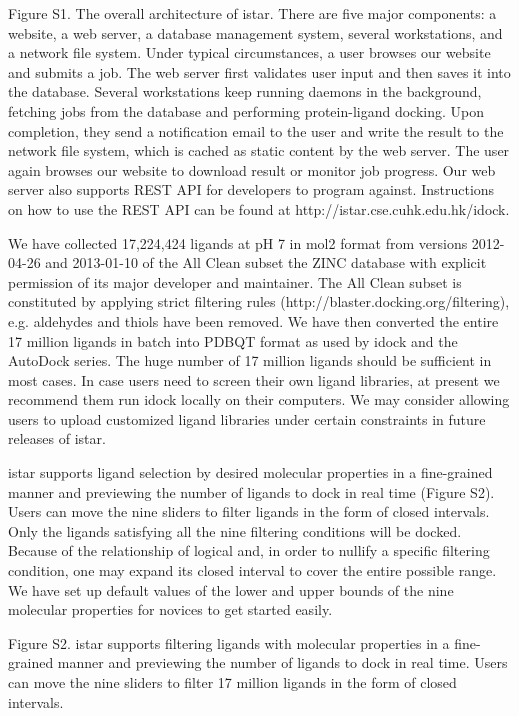 Figure S1. The overall architecture of istar. There are five major components: a website, a web server, a database management system, several workstations, and a network file system. Under typical circumstances, a user browses our website and submits a job. The web server first validates user input and then saves it into the database. Several workstations keep running daemons in the background, fetching jobs from the database and performing protein-ligand docking. Upon completion, they send a notification email to the user and write the result to the network file system, which is cached as static content by the web server. The user again browses our website to download result or monitor job progress. Our web server also supports REST API for developers to program against. Instructions on how to use the REST API can be found at http://istar.cse.cuhk.edu.hk/idock.

We have collected 17,224,424 ligands at pH 7 in mol2 format from versions 2012-04-26 and 2013-01-10 of the All Clean subset the ZINC database \cite{532,1178} with explicit permission of its major developer and maintainer. The All Clean subset is constituted by applying strict filtering rules (http://blaster.docking.org/filtering), e.g. aldehydes and thiols have been removed. We have then converted the entire 17 million ligands in batch into PDBQT format as used by idock and the AutoDock series. The huge number of 17 million ligands should be sufficient in most cases. In case users need to screen their own ligand libraries, at present we recommend them run idock locally on their computers. We may consider allowing users to upload customized ligand libraries under certain constraints in future releases of istar.

istar supports ligand selection by desired molecular properties in a fine-grained manner and previewing the number of ligands to dock in real time (Figure S2). Users can move the nine sliders to filter ligands in the form of closed intervals. Only the ligands satisfying all the nine filtering conditions will be docked. Because of the relationship of logical and, in order to nullify a specific filtering condition, one may expand its closed interval to cover the entire possible range. We have set up default values of the lower and upper bounds of the nine molecular properties for novices to get started easily.

Figure S2. istar supports filtering ligands with molecular properties in a fine-grained manner and previewing the number of ligands to dock in real time. Users can move the nine sliders to filter 17 million ligands in the form of closed intervals.



